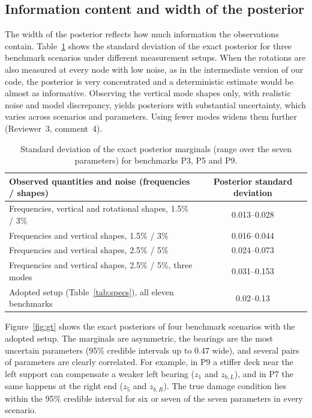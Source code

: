 \documentclass[11pt]{article}
\begin{document}
\subsection{Information content and width of the posterior}

The width of the posterior reflects how much information the observations contain. Table~\ref{tab:information}
shows the standard deviation of the exact posterior for three benchmark scenarios under different measurement setups.
When the rotations are also measured at every node with low noise, as in the intermediate version of our code, the
posterior is very concentrated and a deterministic estimate would be almost as informative. Observing the vertical
mode shapes only, with realistic noise and model discrepancy, yields posteriors with substantial uncertainty, which
varies across scenarios and parameters. Using fewer modes widens them further (Reviewer~3, comment~4).

\begin{table}[H]
\centering\small
\caption{Standard deviation of the exact posterior marginals (range over the seven parameters) for benchmarks P3,
P5 and P9.}
\label{tab:information}
\begin{tabular}{lc}
\toprule
Observed quantities and noise (frequencies / shapes) & Posterior standard deviation \\
\midrule
Frequencies, vertical and rotational shapes, 1.5\% / 3\% & 0.013--0.028 \\
Frequencies and vertical shapes, 1.5\% / 3\% & 0.016--0.044 \\
Frequencies and vertical shapes, 2.5\% / 5\% & 0.024--0.073 \\
Frequencies and vertical shapes, 2.5\% / 5\%, three modes & 0.031--0.153 \\
\midrule
Adopted setup (Table~\ref{tab:specs}), all eleven benchmarks & 0.02--0.13 \\
\bottomrule
\end{tabular}
\end{table}

Figure~\ref{fig:gt} shows the exact posteriors of four benchmark scenarios with the adopted setup. The marginals are
asymmetric, the bearings are the most uncertain parameters (95\% credible intervals up to 0.47 wide), and several
pairs of parameters are clearly correlated. For example, in P9 a stiffer deck near the left support can compensate a
weaker left bearing ($z_1$ and $z_{b,L}$), and in P7 the same happens at the right end ($z_5$ and $z_{b,R}$). The true
damage condition lies within the 95\% credible interval for six or seven of the seven parameters in every scenario.
\end{document}
